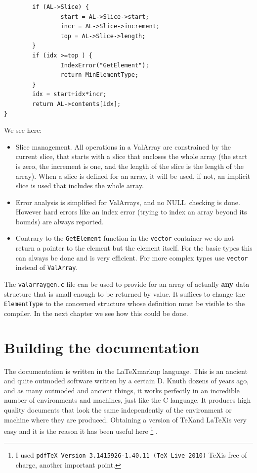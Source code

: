 \documentclass[12pt,a4paper]{memoir} %
\newif\iftth
\newcommand{\Null}{{\iftth \ NULL \else \footnotesize NULL\  \fi}}
\begin{document}
{{\begin{verbatim}
        if (AL->Slice) {
                start = AL->Slice->start;
                incr = AL->Slice->increment;
                top = AL->Slice->length;
        }
        if (idx >=top ) {
                IndexError("GetElement");
                return MinElementType;
        }
        idx = start+idx*incr;
        return AL->contents[idx];
}
\end{verbatim}
We see here:
\begin{itemize}
\item Slice management. All operations in a ValArray are constrained by the current slice, that starts with a slice that encloses the whole array 
(the start is zero, the increment is one, and the length of the slice is the length of the array). When a slice is defined for an array, it will be
used, if not, an implicit slice is used that includes the whole array.
\item Error analysis is simplified for ValArrays, and no \Null checking is done. However hard errors like an index error (trying to index an array beyond
its bounds) are always reported.
\item Contrary to the \verb,GetElement, function in the \verb,vector, container we do not return a pointer to the element but the element
itself. For the basic types this can always be done and is very efficient. For more complex types use \verb,vector, instead of \verb,ValArray,.

\end{itemize}
The \verb,valarraygen.c, file can be used to provide for an array of actually \textbf{any} data structure that is small enough to be returned by value.
It suffices to change the \verb,ElementType, to the concerned structure whose definition must be visible to the compiler. In the next chapter we see how this
could be done.
\section{Building the documentation}
The documentation is written in the \LaTeX markup language. This is an ancient and quite outmoded software written by a certain D. Knuth dozens of
years ago, and as many outmoded and ancient things, it works perfectly in an incredible number of environments and machines, just like the C language.
It produces high quality documents that look the same independently of the environment or machine where they are produced.
Obtaining a version of \TeX and \LaTeX is very easy and it is the reason it has been useful here \footnote{ I used \verb,pdfTeX Version 3.1415926-1.40.11 (TeX Live 2010), \TeX is free of charge, another important point.}
.

}}
\end{document}
